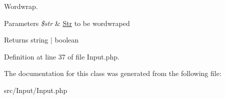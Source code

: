 Wordwrap.


\begin{DoxyParams}{Parameters}
{\em \$str} & \mbox{\hyperlink{namespace_zest_1_1_str}{Str}} to be wordwraped\\
\hline
\end{DoxyParams}
\begin{DoxyReturn}{Returns}
string $\vert$ boolean 
\end{DoxyReturn}


Definition at line 37 of file Input.\+php.



The documentation for this class was generated from the following file\+:\begin{DoxyCompactItemize}
\item 
src/\+Input/Input.\+php\end{DoxyCompactItemize}
